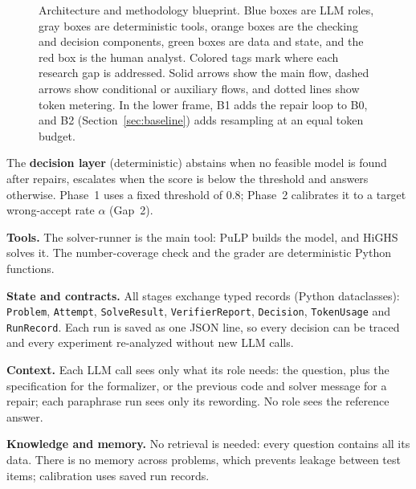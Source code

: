 \documentclass[11pt,a4paper]{article}
\begin{document}
\begin{figure}[!tbp]
\caption{Architecture and methodology blueprint. Blue boxes are LLM roles, gray boxes are deterministic tools, orange boxes are the checking and decision components, green boxes are data and state, and the red box is the human analyst. Colored tags mark where each research gap is addressed. Solid arrows show the main flow, dashed arrows show conditional or auxiliary flows, and dotted lines show token metering. In the lower frame, B1 adds the repair loop to B0, and B2 (Section~\ref{sec:baseline}) adds resampling at an equal token budget.}
\label{fig:arch}
\end{figure}
The \textbf{decision layer} (deterministic) abstains when no feasible model is found after repairs, escalates when the score is below the threshold and answers otherwise. Phase~1 uses a fixed threshold of 0.8; Phase~2 calibrates it to a target wrong-accept rate $\alpha$ (Gap~2).

\textbf{Tools.} The solver-runner is the main tool: PuLP builds the model, and HiGHS solves it. The number-coverage check and the grader are deterministic Python functions.

\textbf{State and contracts.} All stages exchange typed records (Python dataclasses): \texttt{Problem}, \texttt{Attempt}, \texttt{SolveResult}, \texttt{VerifierReport}, \texttt{Decision}, \texttt{TokenUsage} and \texttt{RunRecord}. Each run is saved as one JSON line, so every decision can be traced and every experiment re-analyzed without new LLM calls.

\textbf{Context.} Each LLM call sees only what its role needs: the question, plus the specification for the formalizer, or the previous code and solver message for a repair; each paraphrase run sees only its rewording. No role sees the reference answer.

\textbf{Knowledge and memory.} No retrieval is needed: every question contains all its data. There is no memory across problems, which prevents leakage between test items; calibration uses saved run records.
\end{document}

